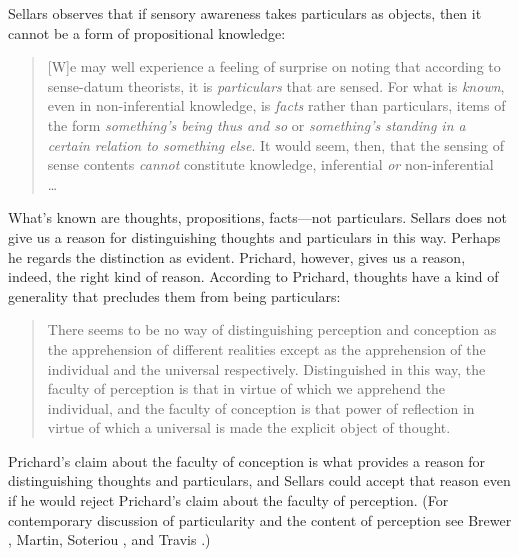 \documentclass[12pt]{article}
\begin{document}
Sellars observes that if sensory awareness takes particulars as objects, then it cannot be a form of propositional knowledge:
\begin{quote}
	[W]e may well experience a feeling of surprise on noting that according to sense-datum theorists, it is \emph{particulars} that are sensed. For what is \emph{known}, even in non-inferential knowledge, is \emph{facts} rather than particulars, items of the form \emph{something's being thus and so} or \emph{something's standing in a certain relation to something else}. It would seem, then, that the sensing of sense contents \emph{cannot} constitute knowledge, inferential \emph{or} non-inferential \ldots\ \citep[§3]{Sellars:1956xp}
\end{quote}
What's known are thoughts, propositions, facts\----\-not par\-ti\-cu\-lars. Sellars does not give us a reason for distinguishing thoughts and particulars in this way. Perhaps he regards the distinction as evident. Prichard, however, gives us a reason, indeed, the right kind of reason. According to Prichard, thoughts have a kind of generality that precludes them from being particulars:
\begin{quote}
	There seems to be no way of distinguishing perception and conception as the apprehension of different realities except as the apprehension of the individual and the universal respectively. Distinguished in this way, the faculty of perception is that in virtue of which we apprehend the individual, and the faculty of conception is that power of reflection in virtue of which a universal is made the explicit object of thought. \citep[]{Prichard:1909yg}
\end{quote}
Prichard's claim about the faculty of conception is what provides a reason for distinguishing thoughts and particulars, and Sellars could accept that reason even if he would reject Prichard's claim about the faculty of perception. (For contemporary discussion of particularity and the content of perception see Brewer \citeyear{Brewer:2008fk}, Martin, \citeyear{Martin:2002jb} Soteriou \citeyear{Soteriou:2000iz,Soteriou:2005fk}, and Travis \citeyear{Travis:2005ys}.)
\end{document}
